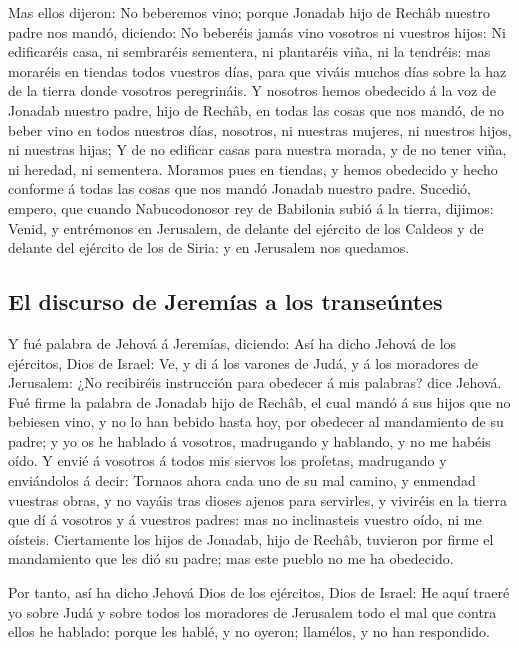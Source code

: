  Mas ellos dijeron: No beberemos vino; porque Jonadab hijo
de Rechâb nuestro padre nos mandó, diciendo: No beberéis jamás vino
vosotros ni vuestros hijos:  Ni edificaréis casa, ni
sembraréis sementera, ni plantaréis viña, ni la tendréis: mas moraréis
en tiendas todos vuestros días, para que viváis muchos días sobre la haz
de la tierra donde vosotros peregrináis.  Y nosotros hemos
obedecido á la voz de Jonadab nuestro padre, hijo de Rechâb, en todas
las cosas que nos mandó, de no beber vino en todos nuestros días,
nosotros, ni nuestras mujeres, ni nuestros hijos, ni nuestras hijas;
 Y de no edificar casas para nuestra morada, y de no tener
viña, ni heredad, ni sementera.  Moramos pues en tiendas,
y hemos obedecido y hecho conforme á todas las cosas que nos mandó
Jonadab nuestro padre.  Sucedió, empero, que cuando
Nabucodonosor rey de Babilonia subió á la tierra, dijimos: Venid, y
entrémonos en Jerusalem, de delante del ejército de los Caldeos y de
delante del ejército de los de Siria: y en Jerusalem nos quedamos.

\hypertarget{el-discurso-de-jeremuxedas-a-los-transeuxfantes}{%
\subsection{El discurso de Jeremías a los
transeúntes}\label{el-discurso-de-jeremuxedas-a-los-transeuxfantes}}

 Y fué palabra de Jehová á Jeremías, diciendo:
 Así ha dicho Jehová de los ejércitos, Dios de Israel:
Ve, y di á los varones de Judá, y á los moradores de Jerusalem: ¿No
recibiréis instrucción para obedecer á mis palabras? dice Jehová.
 Fué firme la palabra de Jonadab hijo de Rechâb, el cual
mandó á sus hijos que no bebiesen vino, y no lo han bebido hasta hoy,
por obedecer al mandamiento de su padre; y yo os he hablado á vosotros,
madrugando y hablando, y no me habéis oído.  Y envié á
vosotros á todos mis siervos los profetas, madrugando y enviándolos á
decir: Tornaos ahora cada uno de su mal camino, y enmendad vuestras
obras, y no vayáis tras dioses ajenos para servirles, y viviréis en la
tierra que dí á vosotros y á vuestros padres: mas no inclinasteis
vuestro oído, ni me oísteis.  Ciertamente los hijos de
Jonadab, hijo de Rechâb, tuvieron por firme el mandamiento que les dió
su padre; mas este pueblo no me ha obedecido.

 Por tanto, así ha dicho Jehová Dios de los ejércitos,
Dios de Israel: He aquí traeré yo sobre Judá y sobre todos los moradores
de Jerusalem todo el mal que contra ellos he hablado: porque les hablé,
y no oyeron; llamélos, y no han respondido.

